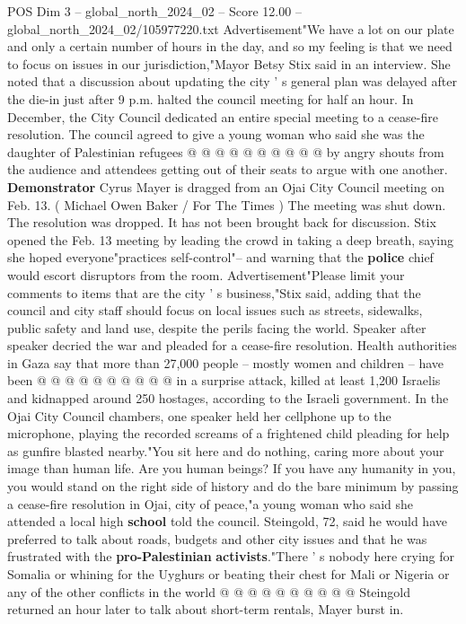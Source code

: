 \begin{textsample}{POS Dim 3 – global\_north\_2024\_02 – Score 12.00 – global\_north\_2024\_02/105977220.txt}
Advertisement"We have a lot on our plate and only a certain number of hours in the day, and so my feeling is that we need to focus on issues in our jurisdiction,"Mayor Betsy Stix said in an interview.
She noted that a discussion about updating the city ' s general plan was delayed after the die-in just after 9 p.m. halted the council meeting for half an hour.
In December, the City Council dedicated an entire special meeting to a cease-fire resolution.
The council agreed to give a young woman who said she was the daughter of Palestinian refugees @ @ @ @ @ @ @ @ @ @ by angry shouts from the audience and attendees getting out of their seats to argue with one another. \textbf{Demonstrator} Cyrus Mayer is dragged from an Ojai City Council meeting on Feb. 13. ( Michael Owen Baker / For The Times ) The meeting was shut down.
The resolution was dropped.
It has not been brought back for discussion.
Stix opened the Feb. 13 meeting by leading the crowd in taking a deep breath, saying she hoped everyone"practices self-control"-- and warning that the \textbf{police} chief would escort disruptors from the room.
Advertisement"Please limit your comments to items that are the city ' s business,"Stix said, adding that the council and city staff should focus on local issues such as streets, sidewalks, public safety and land use, despite the perils facing the world.
Speaker after speaker decried the war and pleaded for a cease-fire resolution.
Health authorities in Gaza say that more than 27,000 people -- mostly women and children -- have been @ @ @ @ @ @ @ @ @ @ in a surprise attack, killed at least 1,200 Israelis and kidnapped around 250 hostages, according to the Israeli government.
In the Ojai City Council chambers, one speaker held her cellphone up to the microphone, playing the recorded screams of a frightened child pleading for help as gunfire blasted nearby."You sit here and do nothing, caring more about your image than human life.
Are you human beings?
If you have any humanity in you, you would stand on the right side of history and do the bare minimum by passing a cease-fire resolution in Ojai, city of peace,"a young woman who said she attended a local high \textbf{school} told the council.
Steingold, 72, said he would have preferred to talk about roads, budgets and other city issues and that he was frustrated with the \textbf{pro-Palestinian} \textbf{activists}."There ' s nobody here crying for Somalia or whining for the Uyghurs or beating their chest for Mali or Nigeria or any of the other conflicts in the world @ @ @ @ @ @ @ @ @ @ Steingold returned an hour later to talk about short-term rentals, Mayer burst in.

\end{textsample}
